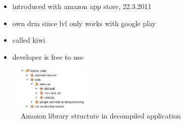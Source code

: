 \begin{itemize}
  \item introduced with amazon app store, 22.3.2011
  \item own drm since lvl only works with google play
  \item called kiwi
  \item developer is free to use
\end{itemize}
\begin{figure}[h]
    \centering
    \includegraphics[width=0.3\textwidth]{data/amazonFolder.png}
    \caption{Amazon library structure in decompiled application}
    \label{fig:amazonFolder}
\end{figure}
